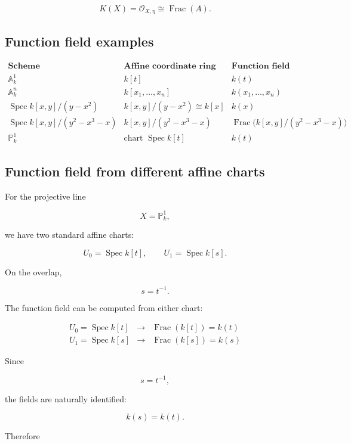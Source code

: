 \documentclass[12pt,a4paper]{article}
\theoremstyle{notespace}
\begin{document}
\[
\boxed{
	K(X)=\mathcal O_{X,\eta}\cong \operatorname{Frac}(A).
}
\]

\subsection{Function field examples}

\[
\begin{array}{c|c|c}
	\textbf{Scheme}
	&
	\textbf{Affine coordinate ring}
	&
	\textbf{Function field}
	\\
	\hline
	\mathbb A_k^1
	&
	k[t]
	&
	k(t)
	\\[5pt]
	\mathbb A_k^n
	&
	k[x_1,\dots,x_n]
	&
	k(x_1,\dots,x_n)
	\\[5pt]
	\operatorname{Spec}k[x,y]/(y-x^2)
	&
	k[x,y]/(y-x^2)\cong k[x]
	&
	k(x)
	\\[5pt]
	\operatorname{Spec}k[x,y]/(y^2-x^3-x)
	&
	k[x,y]/(y^2-x^3-x)
	&
	\operatorname{Frac}\bigl(k[x,y]/(y^2-x^3-x)\bigr)
	\\[5pt]
	\mathbb P_k^1
	&
	\text{chart }\operatorname{Spec}k[t]
	&
	k(t)
\end{array}
\]

\subsection{Function field from different affine charts}

For the projective line

\[
X=\mathbb P_k^1,
\]

we have two standard affine charts:

\[
U_0=\operatorname{Spec}k[t],
\qquad
U_1=\operatorname{Spec}k[s].
\]

On the overlap,

\[
s=t^{-1}.
\]

The function field can be computed from either chart:

\[
\begin{array}{ccc}
	U_0=\operatorname{Spec}k[t]
	&
	\longrightarrow
	&
	\operatorname{Frac}(k[t])=k(t)
	\\[8pt]
	U_1=\operatorname{Spec}k[s]
	&
	\longrightarrow
	&
	\operatorname{Frac}(k[s])=k(s)
\end{array}
\]

Since

\[
s=t^{-1},
\]

the fields are naturally identified:

\[
k(s)=k(t).
\]

Therefore
\end{document}
